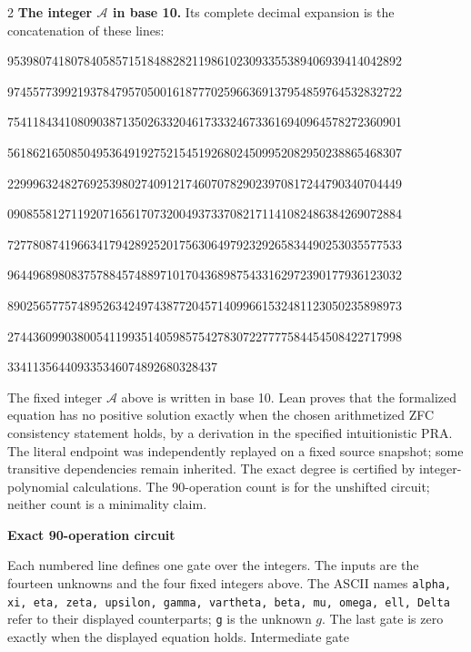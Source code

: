 \documentclass[10pt]{article}
\begin{document}
\begin{multicols}{2}
\textbf{The integer $\mathcal A$ in base 10.}
Its complete decimal expansion is the concatenation of these lines:\par
\begingroup\fontsize{7.7}{8.2}\selectfont{}\par
95398074180784058571518488282119861023093355389406939414042892\par
97455773992193784795705001618777025966369137954859764532832722\par
75411843410809038713502633204617333246733616940964578272360901\par
56186216508504953649192752154519268024509952082950238865468307\par
22999632482769253980274091217460707829023970817244790340704449\par
09085581271192071656170732004937337082171141082486384269072884\par
72778087419663417942892520175630649792329265834490253035577533\par
96449689808375788457488971017043689875433162972390177936123032\par
89025657757489526342497438772045714099661532481123050235898973\par
27443609903800541199351405985754278307227777584454508422717998\par
334113564409335346074892680328437\par
\endgroup
\normalfont\fontsize{7.7}{8.2}\selectfont
The fixed integer $\mathcal A$ above is written in base 10. Lean proves that
the formalized equation has no positive solution exactly when the chosen
arithmetized ZFC consistency statement holds, by a derivation in the specified
intuitionistic PRA. The literal endpoint was independently replayed on a fixed
source snapshot; some transitive dependencies remain inherited. The exact
degree is certified by integer-polynomial calculations. The 90-operation count
is for the unshifted circuit; neither count is a minimality claim.
\end{multicols}
\clearpage
\begin{center}{\large\bfseries Exact 90-operation circuit}\end{center}
Each numbered line defines one gate over the integers. The inputs are the
fourteen unknowns and the four fixed integers above. The ASCII names
\texttt{alpha, xi, eta, zeta, upsilon, gamma, vartheta, beta, mu, omega, ell, Delta}
refer to their displayed counterparts; \texttt{g} is the unknown $g$. The last
gate is zero exactly when the displayed equation holds. Intermediate gate
\end{document}
